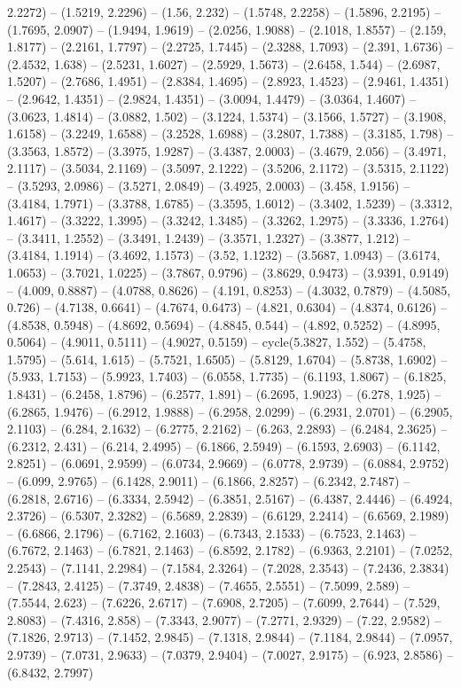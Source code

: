2.2272) -- (1.5219, 2.2296) -- (1.56, 2.232) -- (1.5748, 2.2258) -- (1.5896, 2.2195) -- (1.7695, 2.0907) -- (1.9494, 1.9619) -- (2.0256, 1.9088) -- (2.1018, 1.8557) -- (2.159, 1.8177) -- (2.2161, 1.7797) -- (2.2725, 1.7445) -- (2.3288, 1.7093) -- (2.391, 1.6736) -- (2.4532, 1.638) -- (2.5231, 1.6027) -- (2.5929, 1.5673) -- (2.6458, 1.544) -- (2.6987, 1.5207) -- (2.7686, 1.4951) -- (2.8384, 1.4695) -- (2.8923, 1.4523) -- (2.9461, 1.4351) -- (2.9642, 1.4351) -- (2.9824, 1.4351) -- (3.0094, 1.4479) -- (3.0364, 1.4607) -- (3.0623, 1.4814) -- (3.0882, 1.502) -- (3.1224, 1.5374) -- (3.1566, 1.5727) -- (3.1908, 1.6158) -- (3.2249, 1.6588) -- (3.2528, 1.6988) -- (3.2807, 1.7388) -- (3.3185, 1.798) -- (3.3563, 1.8572) -- (3.3975, 1.9287) -- (3.4387, 2.0003) -- (3.4679, 2.056) -- (3.4971, 2.1117) -- (3.5034, 2.1169) -- (3.5097, 2.1222) -- (3.5206, 2.1172) -- (3.5315, 2.1122) -- (3.5293, 2.0986) -- (3.5271, 2.0849) -- (3.4925, 2.0003) -- (3.458, 1.9156) -- (3.4184, 1.7971) -- (3.3788, 1.6785) -- (3.3595, 1.6012) -- (3.3402, 1.5239) -- (3.3312, 1.4617) -- (3.3222, 1.3995) -- (3.3242, 1.3485) -- (3.3262, 1.2975) -- (3.3336, 1.2764) -- (3.3411, 1.2552) -- (3.3491, 1.2439) -- (3.3571, 1.2327) -- (3.3877, 1.212) -- (3.4184, 1.1914) -- (3.4692, 1.1573) -- (3.52, 1.1232) -- (3.5687, 1.0943) -- (3.6174, 1.0653) -- (3.7021, 1.0225) -- (3.7867, 0.9796) -- (3.8629, 0.9473) -- (3.9391, 0.9149) -- (4.009, 0.8887) -- (4.0788, 0.8626) -- (4.191, 0.8253) -- (4.3032, 0.7879) -- (4.5085, 0.726) -- (4.7138, 0.6641) -- (4.7674, 0.6473) -- (4.821, 0.6304) -- (4.8374, 0.6126) -- (4.8538, 0.5948) -- (4.8692, 0.5694) -- (4.8845, 0.544) -- (4.892, 0.5252) -- (4.8995, 0.5064) -- (4.9011, 0.5111) -- (4.9027, 0.5159) -- cycle(5.3827, 1.552) -- (5.4758, 1.5795) -- (5.614, 1.615) -- (5.7521, 1.6505) -- (5.8129, 1.6704) -- (5.8738, 1.6902) -- (5.933, 1.7153) -- (5.9923, 1.7403) -- (6.0558, 1.7735) -- (6.1193, 1.8067) -- (6.1825, 1.8431) -- (6.2458, 1.8796) -- (6.2577, 1.891) -- (6.2695, 1.9023) -- (6.278, 1.925) -- (6.2865, 1.9476) -- (6.2912, 1.9888) -- (6.2958, 2.0299) -- (6.2931, 2.0701) -- (6.2905, 2.1103) -- (6.284, 2.1632) -- (6.2775, 2.2162) -- (6.263, 2.2893) -- (6.2484, 2.3625) -- (6.2312, 2.431) -- (6.214, 2.4995) -- (6.1866, 2.5949) -- (6.1593, 2.6903) -- (6.1142, 2.8251) -- (6.0691, 2.9599) -- (6.0734, 2.9669) -- (6.0778, 2.9739) -- (6.0884, 2.9752) -- (6.099, 2.9765) -- (6.1428, 2.9011) -- (6.1866, 2.8257) -- (6.2342, 2.7487) -- (6.2818, 2.6716) -- (6.3334, 2.5942) -- (6.3851, 2.5167) -- (6.4387, 2.4446) -- (6.4924, 2.3726) -- (6.5307, 2.3282) -- (6.5689, 2.2839) -- (6.6129, 2.2414) -- (6.6569, 2.1989) -- (6.6866, 2.1796) -- (6.7162, 2.1603) -- (6.7343, 2.1533) -- (6.7523, 2.1463) -- (6.7672, 2.1463) -- (6.7821, 2.1463) -- (6.8592, 2.1782) -- (6.9363, 2.2101) -- (7.0252, 2.2543) -- (7.1141, 2.2984) -- (7.1584, 2.3264) -- (7.2028, 2.3543) -- (7.2436, 2.3834) -- (7.2843, 2.4125) -- (7.3749, 2.4838) -- (7.4655, 2.5551) -- (7.5099, 2.589) -- (7.5544, 2.623) -- (7.6226, 2.6717) -- (7.6908, 2.7205) -- (7.6099, 2.7644) -- (7.529, 2.8083) -- (7.4316, 2.858) -- (7.3343, 2.9077) -- (7.2771, 2.9329) -- (7.22, 2.9582) -- (7.1826, 2.9713) -- (7.1452, 2.9845) -- (7.1318, 2.9844) -- (7.1184, 2.9844) -- (7.0957, 2.9739) -- (7.0731, 2.9633) -- (7.0379, 2.9404) -- (7.0027, 2.9175) -- (6.923, 2.8586) -- (6.8432, 2.7997) 